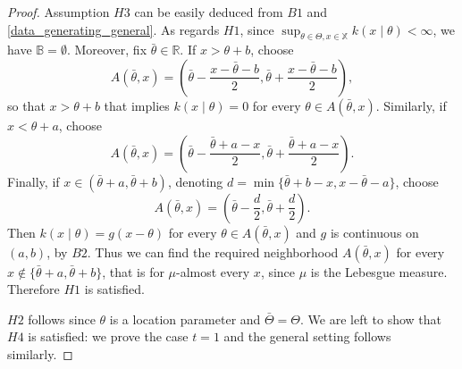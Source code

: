 \documentclass[12pt]{article}
\begin{document}
\begin{proof}
Assumption $H3$ can be easily deduced from $B1$ and \eqref{data_generating_general}. As regards $H1$, since $\sup_{\theta \in \Theta, x \in \mathbb{X}}k(x \mid \theta) < \infty$, we have $\mathbb{B} = \emptyset$. Moreover, fix $\bar{\theta} \in \mathbb{R}$. If $x > \theta +b$, choose
\[
A(\bar{\theta}, x) = \left(\bar{\theta}-\frac{x-\bar{\theta}-b}{2}, \bar{\theta}+\frac{x-\bar{\theta}-b}{2} \right),
\]
so that $x > \theta+b$ that implies $ k(x \mid \theta) = 0$ for every $\theta \in A(\bar{\theta}, x)$. Similarly, if $x < \theta +a$, choose
\[
A(\bar{\theta}, x) = \left(\bar{\theta}-\frac{\bar{\theta}+a-x}{2}, \bar{\theta}+\frac{\bar{\theta}+a-x}{2} \right).
\]
Finally, if $x \in (\bar{\theta}+a, \bar{\theta}+b)$, denoting $d = \min \{\bar{\theta}+b-x, x-\bar{\theta}-a\}$, choose
\[
A(\bar{\theta}, x) = \left(\bar{\theta}-\frac{d}{2}, \bar{\theta}+\frac{d}{2} \right).
\]
Then $k(x \mid \theta) = g(x-\theta)$ for every $\theta \in A(\bar{\theta}, x)$ and $g$ is continuous on $(a,b)$, by $B2$. Thus we can find the required neighborhood $A(\bar{\theta}, x)$ for every $x \not \in \{\bar{\theta}+a, \bar{\theta}+b\}$, that is for $\mu$-almost every $x$, since $\mu$ is the Lebesgue measure. Therefore $H1$ is satisfied.

$H2$ follows since $\theta$ is a location parameter and $\bar{\Theta} = \Theta$. We are left to show that $H4$ is satisfied: we prove the case $t = 1$ and the general setting follows similarly. 


\end{proof}
\end{document}
